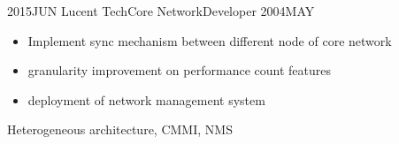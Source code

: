 \begin{experiences}
	\emptySeparator
	\experience
	{2015JUN} {Lucent Tech}{Core Network}{Developer}
	{2004MAY}    {
		\begin{itemize}
			\item Implement sync mechanism between different node of core network
			\item granularity improvement on performance count features 
			\item deployment of network management system
		\end{itemize}
	}
	{Heterogeneous architecture, CMMI, NMS} 
	\emptySeparator
\end{experiences}
